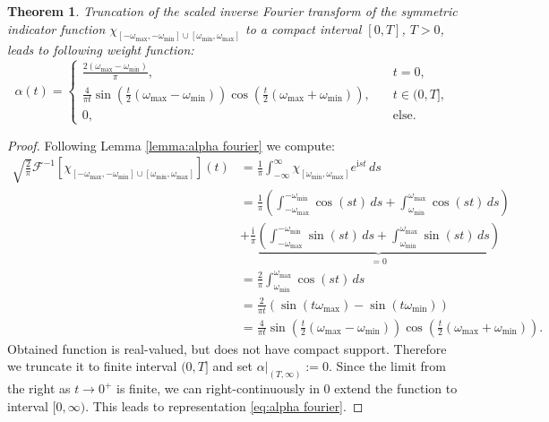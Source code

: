 \documentclass[a4paper,11pt,bibliography=totoc,listof=totoc,headinclude=true,cleardoublepage=empty,oneside]{scrbook}
\newtheorem{theorem}{Theorem}[chapter]
\renewcommand{\i}{\mathrm{i}}
\newcommand{\F}{\mathcal{F}}
\begin{document}
\begin{theorem}
    Truncation of the scaled inverse Fourier transform of the symmetric indicator function $\chi_{\left[-\omega_{\max}, -\omega_{\min}\right]\cup\left[\omega_{\min}, \omega_{\max}\right]}$ to a compact interval $[0, T]$, $T>0$, leads to following weight function:
    \begin{equation}\label{eq:alpha fourier}
        \alpha(t) = \begin{cases}
            \frac{2\left(\omega_{\max} - \omega_{\min}\right)}{\pi}, \quad & t = 0, \\
            \frac{4}{\pi t} \sin\left(\frac{t}{2}\left(\omega_{\max}-\omega_{\min} \right)\right)\cos\left(\frac{t}{2}\left(\omega_{\max}+\omega_{\min} \right)\right), \quad & t \in (0, T], \\
            0, \quad & \text{else.}
        \end{cases}
    \end{equation}
\end{theorem}
\begin{proof}
    Following Lemma \ref{lemma:alpha fourier} we compute:
    \begin{align*}
        \sqrt{\frac{2}{\pi}} \F^{-1}\left[\chi_{\left[-\omega_{\max}, -\omega_{\min}\right]\cup\left[\omega_{\min}, \omega_{\max}\right]}\right](t) &= \frac{1}{\pi} \int_{-\infty}^\infty \chi_{\left[\omega_{\min}, \omega_{\max}\right]} e^{\i st} \, ds \\ 
        & = \frac{1}{\pi} \left( \int_{-\omega_{\max}}^{-\omega_{\min}} \cos(st) \, ds + \int_{\omega_{\min}}^{\omega_{\max}} \cos(st) \, ds\right) \\ &+ \frac{\i}{\pi} \underbrace{\left(\int_{-\omega_{\max}}^{-\omega_{\min}} \sin(st) \, ds + \int_{\omega_{\min}}^{\omega_{\max}} \sin(st) \, ds \right)}_{=0} \\
        &= \frac{2}{\pi}\int_{\omega_{\min}}^{\omega_{\max}} \cos(st) \, ds \\
        &= \frac{2}{\pi t} \left(\sin\left(t\omega_{\max}\right) - \sin\left(t\omega_{\min}\right)\right) \\
        &= \frac{4}{\pi t} \sin\left(\frac{t}{2}\left(\omega_{\max}-\omega_{\min} \right)\right)\cos\left(\frac{t}{2}\left(\omega_{\max}+\omega_{\min} \right)\right).
    \end{align*}
    Obtained function is real-valued, but does not have compact support. Therefore we truncate it to finite interval $(0, T]$ and set $\alpha|_{(T, \infty)} := 0$. Since the limit from the right as $t\rightarrow 0^+$ is finite, we can right-continuously in 0 extend the function to interval $[0, \infty)$. This leads to representation \eqref{eq:alpha fourier}.
\end{proof}
\end{document}
